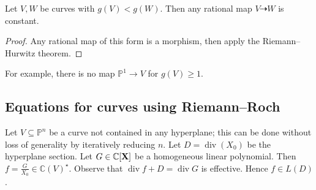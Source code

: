 \begin{corollary}
    Let \( V, W \) be curves with \( g(V) < g(W) \).
    Then any rational map \( V \dashrightarrow W \) is constant.
\end{corollary}
\begin{proof}
    Any rational map of this form is a morphism, then apply the Riemann--Hurwitz theorem.
\end{proof}
For example, there is no map \( \mathbb P^1 \to V \) for \( g(V) \geq 1 \).

\subsection{Equations for curves using Riemann--Roch}
Let \( V \subseteq \mathbb P^n \) be a curve not contained in any hyperplane; this can be done without loss of generality by iteratively reducing \( n \).
Let \( D = \operatorname{div}(X_0) \) be the hyperplane section.
Let \( G \in \mathbb C[\vb X] \) be a homogeneous linear polynomial.
Then \( f = \frac{G}{X_0} \in \mathbb C(V)^\star \).
Observe that \( \operatorname{div} f + D = \operatorname{div} G \) is effective.
Hence \( f \in L(D) \).

